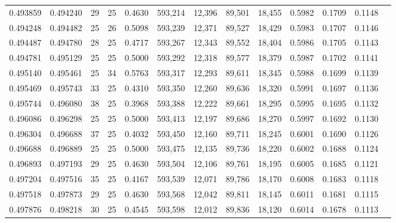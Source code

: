 \begin{tabular}{rrrrrrrrrrrrr}
0.493859 & 0.494240 &    29 &  25 &                                     0.4630 & 593,214 &  12,396 &  89,501 &  18,455 & 0.5982 & 0.1709 & 0.1148 \\
0.494248 & 0.494482 &    25 &  26 &                                     0.5098 & 593,239 &  12,371 &  89,527 &  18,429 & 0.5983 & 0.1707 & 0.1146 \\
0.494487 & 0.494780 &    28 &  25 &                                     0.4717 & 593,267 &  12,343 &  89,552 &  18,404 & 0.5986 & 0.1705 & 0.1143 \\
0.494781 & 0.495129 &    25 &  25 &                                     0.5000 & 593,292 &  12,318 &  89,577 &  18,379 & 0.5987 & 0.1702 & 0.1141 \\
0.495140 & 0.495461 &    25 &  34 &                                     0.5763 & 593,317 &  12,293 &  89,611 &  18,345 & 0.5988 & 0.1699 & 0.1139 \\
0.495469 & 0.495743 &    33 &  25 &                                     0.4310 & 593,350 &  12,260 &  89,636 &  18,320 & 0.5991 & 0.1697 & 0.1136 \\
0.495744 & 0.496080 &    38 &  25 &                                     0.3968 & 593,388 &  12,222 &  89,661 &  18,295 & 0.5995 & 0.1695 & 0.1132 \\
0.496086 & 0.496298 &    25 &  25 &                                     0.5000 & 593,413 &  12,197 &  89,686 &  18,270 & 0.5997 & 0.1692 & 0.1130 \\
0.496304 & 0.496688 &    37 &  25 &                                     0.4032 & 593,450 &  12,160 &  89,711 &  18,245 & 0.6001 & 0.1690 & 0.1126 \\
0.496688 & 0.496889 &    25 &  25 &                                     0.5000 & 593,475 &  12,135 &  89,736 &  18,220 & 0.6002 & 0.1688 & 0.1124 \\
0.496893 & 0.497193 &    29 &  25 &                                     0.4630 & 593,504 &  12,106 &  89,761 &  18,195 & 0.6005 & 0.1685 & 0.1121 \\
0.497204 & 0.497516 &    35 &  25 &                                     0.4167 & 593,539 &  12,071 &  89,786 &  18,170 & 0.6008 & 0.1683 & 0.1118 \\
0.497518 & 0.497873 &    29 &  25 &                                     0.4630 & 593,568 &  12,042 &  89,811 &  18,145 & 0.6011 & 0.1681 & 0.1115 \\
0.497876 & 0.498218 &    30 &  25 &                                     0.4545 & 593,598 &  12,012 &  89,836 &  18,120 & 0.6014 & 0.1678 & 0.1113 \\

\end{tabular}
